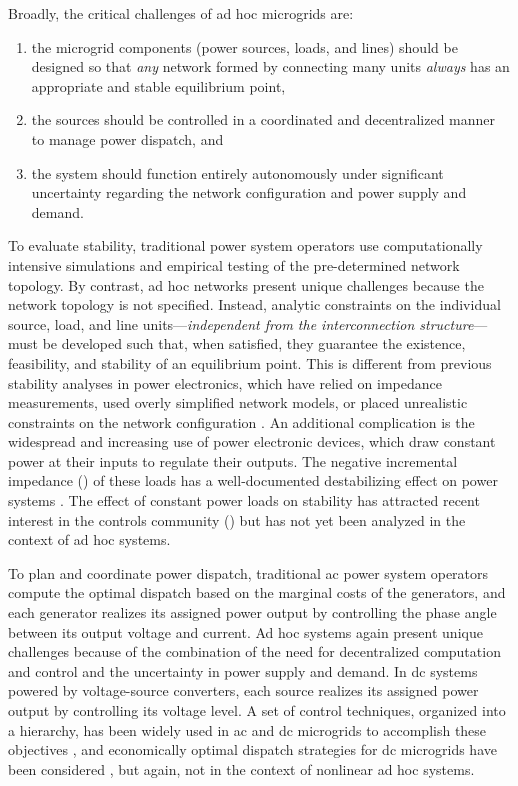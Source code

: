 \documentclass[letterpaper, 10 pt, conference]{ieeeconf}
\begin{document}
Broadly, the critical challenges of ad hoc microgrids are:

\begin{enumerate}
    \item the microgrid components (power sources, loads, and lines) should be designed so that \textit{any} network formed by connecting many units \textit{always} has an appropriate and stable equilibrium point,
    \item the sources should be controlled in a coordinated and decentralized manner to manage power dispatch, and
    \item the system should function entirely autonomously under significant uncertainty regarding the network configuration and power supply and demand.
\end{enumerate}

To evaluate stability, traditional power system operators use computationally intensive simulations and empirical testing of the pre-determined network topology. By contrast, ad hoc networks present unique challenges because the network topology is not specified. Instead, analytic constraints on the individual source, load, and line units---\textit{independent from the interconnection structure}---must be developed such that, when satisfied, they guarantee the existence, feasibility, and stability of an equilibrium point. This is different from previous stability analyses in power electronics, which have relied on impedance measurements, used overly simplified network models, or placed unrealistic constraints on the network configuration \cite{CriteriaReview,ROM}. An additional complication is the widespread and increasing use of power electronic devices, which draw constant power at their inputs to regulate their outputs. The negative incremental impedance () of these loads has a well-documented destabilizing effect on power systems \cite{cplinstability}. The effect of constant power loads on stability has attracted recent interest in the controls community (\cite{Sanchez:2013gl,Bolognani:2015ek,SimpsonPorco:2015hp,Cezar:2015io,Barabanov:2016ki}) but has not yet been analyzed in the context of ad hoc systems. 

To plan and coordinate power dispatch, traditional ac power system operators compute the optimal dispatch based on the marginal costs of the generators, and each generator realizes its assigned power output by controlling the phase angle between its output voltage and current. Ad hoc systems again present unique challenges because of the combination of the need for decentralized computation and control and the uncertainty in power supply and demand. In dc systems powered by voltage-source converters, each source realizes its assigned power output by controlling its voltage level. A set of control techniques, organized into a hierarchy, has been widely used in ac and dc microgrids to accomplish these objectives \cite{GuerreroHierarchy}, and economically optimal dispatch strategies for dc microgrids have been considered \cite{Zhao:2015eu}, but again, not in the context of nonlinear ad hoc systems.
\end{document}
